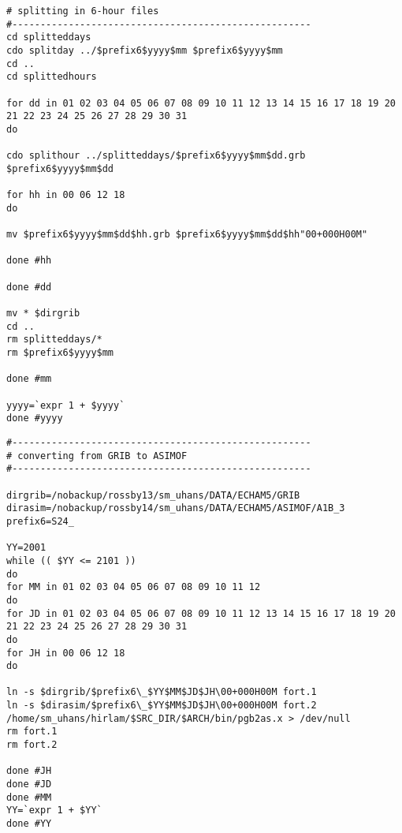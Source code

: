 \documentclass{article}
\begin{document}
\begin{verbatim}
# splitting in 6-hour files
#-----------------------------------------------------
cd splitteddays
cdo splitday ../$prefix6$yyyy$mm $prefix6$yyyy$mm
cd ..
cd splittedhours

for dd in 01 02 03 04 05 06 07 08 09 10 11 12 13 14 15 16 17 18 19 20 21 22 23 24 25 26 27 28 29 30 31
do

cdo splithour ../splitteddays/$prefix6$yyyy$mm$dd.grb $prefix6$yyyy$mm$dd

for hh in 00 06 12 18
do

mv $prefix6$yyyy$mm$dd$hh.grb $prefix6$yyyy$mm$dd$hh"00+000H00M"

done #hh

done #dd

mv * $dirgrib
cd ..
rm splitteddays/*
rm $prefix6$yyyy$mm 

done #mm

yyyy=`expr 1 + $yyyy`
done #yyyy
\end{verbatim}

\begin{verbatim}
#-----------------------------------------------------
# converting from GRIB to ASIMOF
#-----------------------------------------------------

dirgrib=/nobackup/rossby13/sm_uhans/DATA/ECHAM5/GRIB	
dirasim=/nobackup/rossby14/sm_uhans/DATA/ECHAM5/ASIMOF/A1B_3
prefix6=S24_

YY=2001
while (( $YY <= 2101 ))
do
for MM in 01 02 03 04 05 06 07 08 09 10 11 12
do
for JD in 01 02 03 04 05 06 07 08 09 10 11 12 13 14 15 16 17 18 19 20 21 22 23 24 25 26 27 28 29 30 31
do
for JH in 00 06 12 18
do

ln -s $dirgrib/$prefix6\_$YY$MM$JD$JH\00+000H00M fort.1
ln -s $dirasim/$prefix6\_$YY$MM$JD$JH\00+000H00M fort.2
/home/sm_uhans/hirlam/$SRC_DIR/$ARCH/bin/pgb2as.x > /dev/null
rm fort.1
rm fort.2

done #JH
done #JD
done #MM
YY=`expr 1 + $YY`
done #YY

\end{verbatim}

%
%
\newpage
\end{document}
